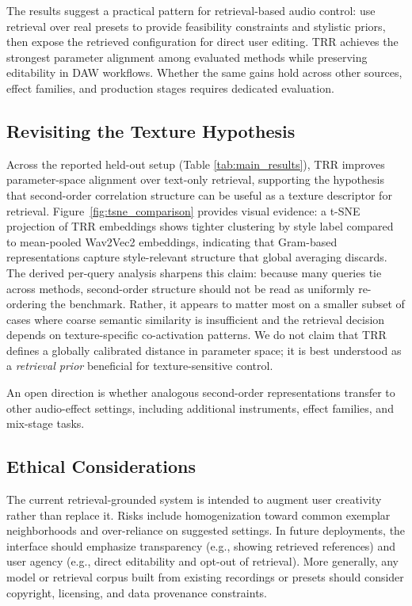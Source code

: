The results suggest a practical pattern for retrieval-based audio control: use retrieval over real presets to provide feasibility constraints and stylistic priors, then expose the retrieved configuration for direct user editing. TRR achieves the strongest parameter alignment among evaluated methods while preserving editability in DAW workflows. Whether the same gains hold across other sources, effect families, and production stages requires dedicated evaluation.

\subsection{Revisiting the Texture Hypothesis}

Across the reported held-out setup (Table \ref{tab:main_results}), TRR improves parameter-space alignment over text-only retrieval, supporting the hypothesis that second-order correlation structure can be useful as a texture descriptor for retrieval. Figure~\ref{fig:tsne_comparison} provides visual evidence: a t-SNE projection of TRR embeddings shows tighter clustering by style label compared to mean-pooled Wav2Vec2 embeddings, indicating that Gram-based representations capture style-relevant structure that global averaging discards. The derived per-query analysis sharpens this claim: because many queries tie across methods, second-order structure should not be read as uniformly re-ordering the benchmark. Rather, it appears to matter most on a smaller subset of cases where coarse semantic similarity is insufficient and the retrieval decision depends on texture-specific co-activation patterns. We do not claim that TRR defines a globally calibrated distance in parameter space; it is best understood as a \textit{retrieval prior} beneficial for texture-sensitive control.

An open direction is whether analogous second-order representations transfer to other audio-effect settings, including additional instruments, effect families, and mix-stage tasks.

\subsection{Ethical Considerations}

The current retrieval-grounded system is intended to augment user creativity rather than replace it. Risks include homogenization toward common exemplar neighborhoods and over-reliance on suggested settings. In future deployments, the interface should emphasize transparency (e.g., showing retrieved references) and user agency (e.g., direct editability and opt-out of retrieval). More generally, any model or retrieval corpus built from existing recordings or presets should consider copyright, licensing, and data provenance constraints.


